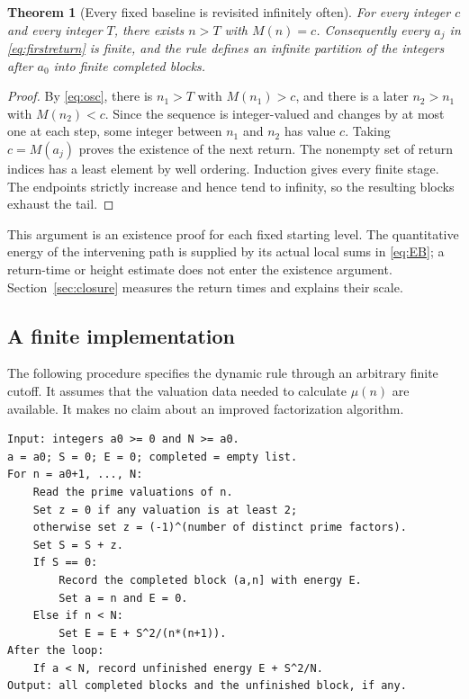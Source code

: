 \documentclass[11pt]{article}
\newtheorem{theorem}{Theorem}[section]
\theoremstyle{definition}
\theoremstyle{remark}
\begin{document}
\begin{theorem}[Every fixed baseline is revisited infinitely often]\label{thm:revisit}
For every integer $c$ and every integer $T$, there exists $n>T$ with $M(n)=c$. Consequently every $a_j$ in \eqref{eq:firstreturn} is finite, and the rule defines an infinite partition of the integers after $a_0$ into finite completed blocks.
\end{theorem}

\begin{proof}
By \eqref{eq:osc}, there is $n_1>T$ with $M(n_1)>c$, and there is a later $n_2>n_1$ with $M(n_2)<c$. Since the sequence is integer-valued and changes by at most one at each step, some integer between $n_1$ and $n_2$ has value $c$. Taking $c=M(a_j)$ proves the existence of the next return. The nonempty set of return indices has a least element by well ordering. Induction gives every finite stage. The endpoints strictly increase and hence tend to infinity, so the resulting blocks exhaust the tail.
\end{proof}

This argument is an existence proof for each fixed starting level. The quantitative energy of the intervening path is supplied by its actual local sums in \eqref{eq:EB}; a return-time or height estimate does not enter the existence argument. Section~\ref{sec:closure} measures the return times and explains their scale.

\subsection{A finite implementation}

The following procedure specifies the dynamic rule through an arbitrary finite cutoff. It assumes that the valuation data needed to calculate $\mu(n)$ are available. It makes no claim about an improved factorization algorithm.

\begin{verbatim}
Input: integers a0 >= 0 and N >= a0.
a = a0; S = 0; E = 0; completed = empty list.
For n = a0+1, ..., N:
    Read the prime valuations of n.
    Set z = 0 if any valuation is at least 2;
    otherwise set z = (-1)^(number of distinct prime factors).
    Set S = S + z.
    If S == 0:
        Record the completed block (a,n] with energy E.
        Set a = n and E = 0.
    Else if n < N:
        Set E = E + S^2/(n*(n+1)).
After the loop:
    If a < N, record unfinished energy E + S^2/N.
Output: all completed blocks and the unfinished block, if any.
\end{verbatim}
\end{document}
